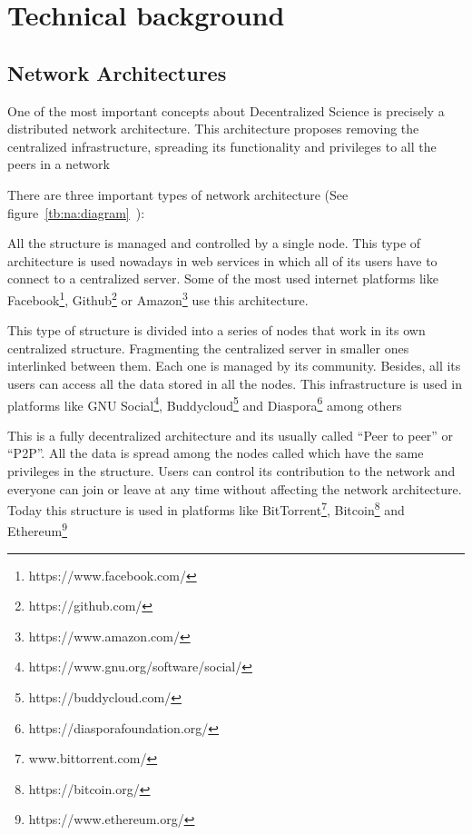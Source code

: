 \section{Technical background}
\label{tb}
\subsection{Network Architectures}
\label{tb:na}

One of the most important concepts about Decentralized Science is precisely a
distributed network architecture. This architecture proposes removing the
centralized infrastructure, spreading its functionality and privileges to all
the peers in a network

There are three important types of network architecture (See
figure~\ref{tb:na:diagram}~\cite{baran1964distributed}):

\begin{itemize}
   All the structure is managed and controlled
  by a single node. This type of architecture is used nowadays in web services
  in which all of its users have to connect to a centralized server. Some of the
  most used internet platforms like
  Facebook\footnote{https://www.facebook.com/},
  Github\footnote{https://github.com/} or
  Amazon\footnote{https://www.amazon.com/} use this architecture.

  
   This type of structure is divided into a
  series of nodes that work in its own centralized structure. Fragmenting the
  centralized server in smaller ones interlinked between them. Each one is
  managed by its community. Besides, all its users can access all the data
  stored in all the nodes. This infrastructure is used in platforms like GNU
  Social\footnote{https://www.gnu.org/software/social/},
  Buddycloud\footnote{https://buddycloud.com/} and
  Diaspora\footnote{https://diasporafoundation.org/} among others

   This is a fully decentralized architecture
  and its usually called ``Peer to peer'' or ``P2P''. All the data is spread
  among the nodes called  which have the same privileges in the
  structure. Users can control its contribution to the network and everyone can
  join or leave at any time without affecting the network architecture. Today
  this structure is used in platforms like
  BitTorrent\footnote{www.bittorrent.com/},
  Bitcoin\footnote{https://bitcoin.org/} and
  Ethereum\footnote{https://www.ethereum.org/}
\end{itemize}


